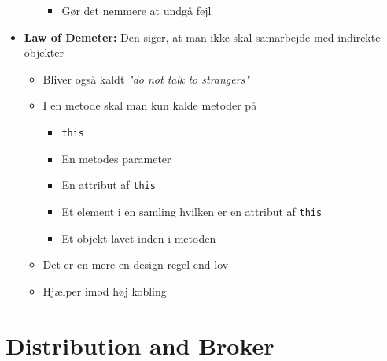 \documentclass[a4, english]{article}
\begin{document}
\begin{itemize}
\begin{itemize}
\begin{itemize}
      \item Gør det nemmere at undgå fejl
    \end{itemize}
  \end{itemize}
  \item \textbf{Law of Demeter:} Den siger, at man ikke skal samarbejde med indirekte objekter
  \begin{itemize}
  	\item Bliver også kaldt \textit{"do not talk to strangers"}
    \item I en metode skal man kun kalde metoder på 
    \begin{itemize}
    	\item \texttt{this}
      \item En metodes parameter
      \item En attribut af \texttt{this} 
      \item Et element i en samling hvilken er en attribut af \texttt{this}
      \item Et objekt lavet inden i metoden 
    \end{itemize}
    \item Det er en mere en design regel end lov
    \item Hjælper imod høj kobling 
  \end{itemize}
\end{itemize}
\newpage

\section{Distribution and Broker}
\end{document}
